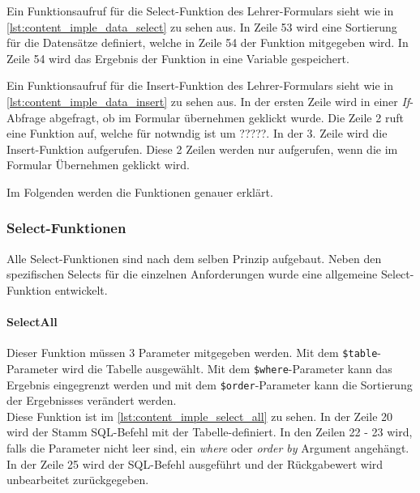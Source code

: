 Ein Funktionsaufruf für die Select-Funktion des Lehrer-Formulars sieht wie in \autoref{lst:content_imple_data_select} zu sehen aus. In Zeile 53 wird eine Sortierung für die Datensätze definiert, welche in Zeile 54 der Funktion mitgegeben wird. In Zeile 54 wird das Ergebnis der Funktion in eine Variable gespeichert.



Ein Funktionsaufruf für die Insert-Funktion des Lehrer-Formulars sieht wie in \autoref{lst:content_imple_data_insert} zu sehen aus. In der ersten Zeile wird in einer \textit{If}-Abfrage abgefragt, ob im Formular übernehmen geklickt wurde. Die Zeile 2 ruft eine Funktion auf, welche für notwndig ist um ?????. In der 3. Zeile wird die Insert-Funktion aufgerufen. Diese 2 Zeilen werden nur aufgerufen, wenn die im Formular Übernehmen geklickt wird.



Im Folgenden werden die Funktionen genauer erklärt.

\subsubsection{Select-Funktionen}
Alle Select-Funktionen sind nach dem selben Prinzip aufgebaut. Neben den spezifischen Selects für die einzelnen Anforderungen wurde eine allgemeine Select-Funktion entwickelt.
\paragraph{SelectAll\\}
Dieser Funktion müssen 3 Parameter mitgegeben werden. Mit dem \texttt{\$table}-Parameter wird die Tabelle ausgewählt. Mit dem \texttt{\$where}-Parameter kann das Ergebnis eingegrenzt werden und mit dem \texttt{\$order}-Parameter kann die Sortierung der Ergebnisses verändert werden.\\
Diese Funktion ist im \autoref{lst:content_imple_select_all} zu sehen. In der Zeile 20 wird der Stamm SQL-Befehl mit der Tabelle-definiert. In den Zeilen 22 - 23 wird, falls die Parameter nicht leer sind, ein \textit{where} oder \textit{order by} Argument angehängt. In der Zeile 25 wird der SQL-Befehl ausgeführt und der Rückgabewert wird unbearbeitet zurückgegeben.

